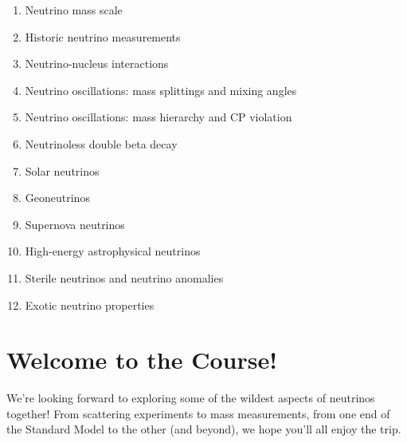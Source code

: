 \documentclass[12pt]{amsart}
\begin{document}
\begin{enumerate}
	\item Neutrino mass scale
	\item Historic neutrino measurements
	\item	Neutrino-nucleus interactions 
	\item	Neutrino oscillations: mass splittings and mixing angles
	\item Neutrino oscillations: mass hierarchy and CP violation
	\item	Neutrinoless double beta decay
	\item Solar neutrinos
	\item	Geoneutrinos
	\item	Supernova neutrinos
	\item	High-energy astrophysical neutrinos
	\item	Sterile neutrinos and neutrino anomalies
	\item	Exotic neutrino properties
\end{enumerate}


\section{Welcome to the Course!}

We're looking forward to exploring some of the wildest aspects of neutrinos together! From scattering experiments to mass measurements, from one end of the Standard Model to the other (and beyond), we hope you'll all enjoy the trip.
\end{document}
